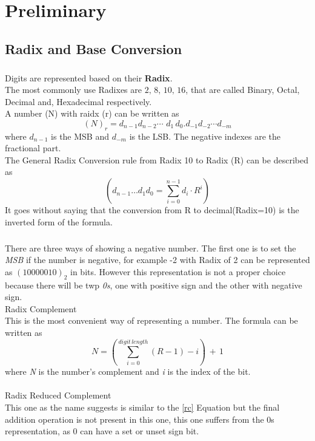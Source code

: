 \chapter{Preliminary}
\section{Radix and Base Conversion}
\paragraph{}
Digits are represented based on their \textbf{Radix}.\\
The most commonly use Radixes are \(2,\,8,\,10,\,16\), that are called Binary, Octal, Decimal and, Hexadecimal respectively.\\
A number (N) with raidx (r) can be written as\large{\[
(N)_{r} = d_{n-1} d_{n-2}\cdots\,\,d_{1}\,d_{0} . d_{-1} d_{-2} \cdots d_{-m}
\]}
where \(d_{n-1}\) is the MSB and \(d_{-m}\) is the LSB. The negative indexes are the fractional part.\\
The General Radix Conversion rule from Radix 10 to Radix (R) can be described as \[
\left(d_{n-1}\dots d_{1}d_{0}=\sum _{i=0}^{n-1}d_{i}\cdot R^{i}\right)
\]\label{conv}
It goes without saying that the conversion from R to decimal(Radix=10) is the inverted form of the formula.
\paragraph{}
There are three ways of showing a negative number. The first one is to set the \textit{MSB} if the number is negative, for example -2 with Radix of 2 can be represented as \((10000010)_{2}\) in bits. However this representation is not a proper choice because there will be twp \textit{0s}, one with positive sign and the other with negative sign.\\
\newline
Radix Complement\\
This is the most convenient way of representing a number.
The formula can be written as
\[
	N = \left(\sum_{i=0}^{digit\,length}\left(R-1\right) - i \right)\,+\,1
\]\label{rc}
where \textit{N} is the number's complement and \textit{i} is the index of the bit.\\ \\
Radix Reduced Complement\\
This one as the name suggests is similar to the \ref{rc} Equation but the final addition operation is not present in this one, this one suffers from the 0s representation, as 0 can have a set or unset sign bit.\\

